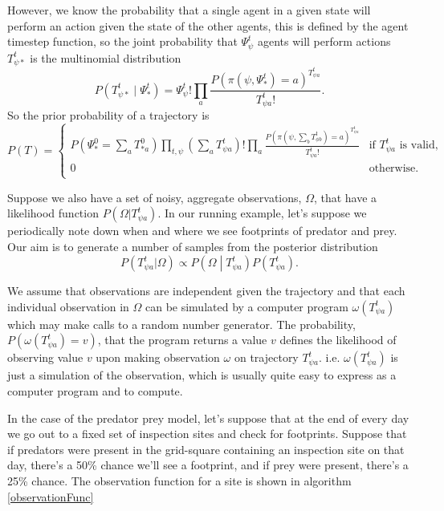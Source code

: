 However, we know the probability that a single agent in a given state will perform an action given the state of the other agents, this is defined by the agent timestep function, so the joint probability that $\Psi^t_\psi$ agents will perform actions $T^t_{\psi *}$ is the multinomial distribution
\[
P\left(T^t_{\psi *} \mid \Psi^t_*\right) = \Psi^t_\psi!\prod_a \frac{P(\pi(\psi,\Psi^t_*)=a)^{T^{t}_{\psi a}}}{T^{t}_{\psi a}!}.
\]
So the prior probability of a trajectory is
\[
P(T) =
\begin{cases}
P(\Psi^0_* = \sum_aT^0_{* a}) \prod_{t, \psi}\left(\sum_a T^t_{\psi a}\right)!\prod_a \frac{P(\pi(\psi,\sum_bT^{t}_{\phi b})=a)^{T^{t}_{\psi a}}}{T^{t}_{\psi a}!} & \text{if } T^t_{\psi a} \text{ is valid}, \\
0 & \text{otherwise}.\\
\end{cases}
\]

Suppose we also have a set of noisy, aggregate observations, $\Omega$, that have a likelihood function $P(\Omega|T^t_{\psi a})$. In our running example, let's suppose we periodically note down when and where we see footprints of predator and prey. Our aim is to generate a number of samples from the posterior distribution
\[
P(T^t_{\psi a}|\Omega) \propto P\left(\Omega \middle| T^{t}_{\psi a}\right)P(T^t_{\psi a}).
\]

We assume that observations are independent given the trajectory and that each individual observation in $\Omega$ can be simulated by a computer program $\omega(T^t_{\psi a})$ which may make calls to a random number generator. The probability, $P(\omega(T^t_{\psi a}) = v)$, that the program returns a value $v$ defines the likelihood of observing value $v$ upon making observation $\omega$ on trajectory $T^t_{\psi a}$. i.e. $\omega(T^t_{\psi a})$ is just a simulation of the observation, which is usually quite easy to express as a computer program and to compute. 

In the case of the predator prey model, let's suppose that at the end of every day we go out to a fixed set of inspection sites and check for footprints. Suppose that if predators were present in the grid-square containing an inspection site on that day, there's a 50\% chance we'll see a footprint, and if prey were present, there's a 25\% chance. The observation function for a site is shown in algorithm \ref{observationFunc}

